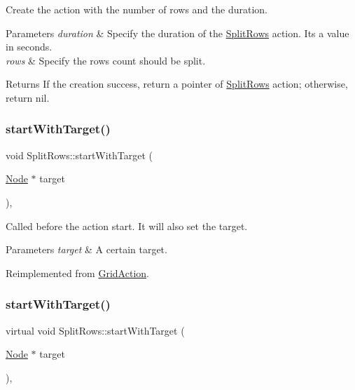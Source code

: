 Create the action with the number of rows and the duration. 


\begin{DoxyParams}{Parameters}
{\em duration} & Specify the duration of the \hyperlink{classSplitRows}{Split\+Rows} action. It\textquotesingle{}s a value in seconds. \\
\hline
{\em rows} & Specify the rows count should be split. \\
\hline
\end{DoxyParams}
\begin{DoxyReturn}{Returns}
If the creation success, return a pointer of \hyperlink{classSplitRows}{Split\+Rows} action; otherwise, return nil. 
\end{DoxyReturn}
\mbox{\label{classSplitRows_a46357d39bbf4e251086b42e4ad9ba9a1}} 
\subsubsection{\texorpdfstring{start\+With\+Target()}{startWithTarget()}\hspace{0.1cm}{\footnotesize\ttfamily [1/2]}}
{\footnotesize\ttfamily void Split\+Rows\+::start\+With\+Target (\begin{DoxyParamCaption}\item[{\hyperlink{classNode}{Node} $\ast$}]{target }\end{DoxyParamCaption})\hspace{0.3cm}{\ttfamily [override]}, {\ttfamily [virtual]}}

Called before the action start. It will also set the target.


\begin{DoxyParams}{Parameters}
{\em target} & A certain target. \\
\hline
\end{DoxyParams}


Reimplemented from \hyperlink{classGridAction_a33e2c1bc95bbcf6b16428097b4fd4b61}{Grid\+Action}.

\mbox{\label{classSplitRows_a12d92df62d1f441371e4563fc3aa3196}} 
\subsubsection{\texorpdfstring{start\+With\+Target()}{startWithTarget()}\hspace{0.1cm}{\footnotesize\ttfamily [2/2]}}
{\footnotesize\ttfamily virtual void Split\+Rows\+::start\+With\+Target (\begin{DoxyParamCaption}\item[{\hyperlink{classNode}{Node} $\ast$}]{target }\end{DoxyParamCaption})\hspace{0.3cm}{\ttfamily [override]}, {\ttfamily [virtual]}}

